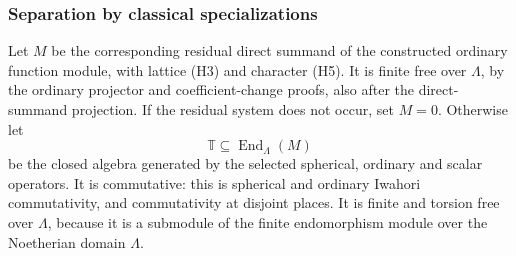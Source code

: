 \subsubsection{Separation by classical specializations}
Let \(M\) be the corresponding residual direct summand of
the constructed ordinary function module, with lattice (H3)
and character (H5).
It is finite free over \(\Lambda\), by the ordinary projector
and coefficient-change proofs, also after the direct-summand
projection. If the residual system does not occur, set \(M=0\).
Otherwise let
\[
              \mathbb T\subseteq\operatorname{End}_\Lambda(M)
 \tag{H8}
\]
be the closed algebra generated by the selected spherical,
ordinary and scalar operators.
It is commutative: this is spherical and ordinary Iwahori
commutativity, and commutativity at disjoint places.
It is finite and torsion free over \(\Lambda\), because
it is a submodule of the finite endomorphism module over
the Noetherian domain \(\Lambda\).

